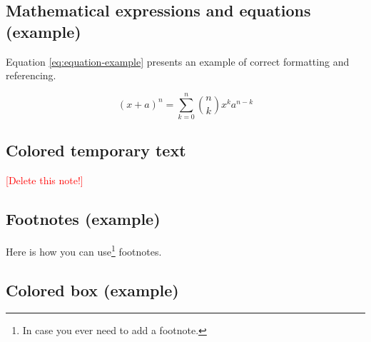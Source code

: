 \subsection{Mathematical expressions and equations (example)}

Equation \ref{eq:equation-example} presents an example of correct
formatting and referencing.

\begin{equation} \label{eq:equation-example}
  (x+a)^n = \sum_{k=0}^{n} {n \choose k} x^ka^{n-k}
\end{equation}


\subsection{Colored temporary text}

\textcolor{red}{[Delete this note!]}

\subsection{Footnotes (example)}

Here is how you can use\footnote{In case you ever need to add a footnote.} footnotes.

\subsection{Colored box (example)}

\begin{tcolorbox}[arc=0pt, outer arc=0pt, boxrule=0pt, left=0mm]
\blindtext
\end{tcolorbox}
